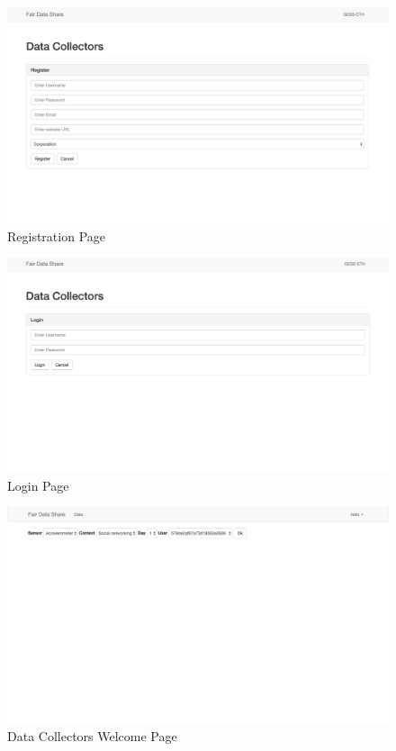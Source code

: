 
\begin{figure}[ht!]
\centering
\includegraphics[width=\textwidth,keepaspectratio]{./images/fds_dc_register}
\caption{Registration Page\label{fig:fdsdcregister}}
\end{figure}

\begin{figure}[ht!]
\centering
\includegraphics[width=\textwidth,keepaspectratio]{./images/fds_dc_login}
\caption{Login Page\label{fig:fdsdclogin}}
\end{figure}

\begin{figure}[ht!]
\centering
\includegraphics[width=\textwidth,keepaspectratio]{./images/fds_dc_welcome}
\caption{Data Collectors Welcome Page \label{fig:fds5}}
\end{figure}






